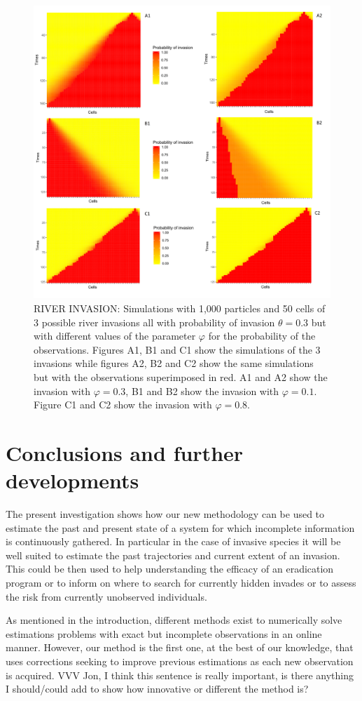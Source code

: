 \begin{figure}
    \includegraphics[width=\textwidth]{river_007.png}
    \caption{RIVER INVASION: Simulations with 1,000 particles and 50 cells of 3 possible river invasions all with probability of invasion $\theta = 0.3$ but with different values of the parameter $\varphi$ for the probability of the observations. Figures A1, B1 and C1 show the simulations of the 3 invasions while figures A2, B2 and C2 show the same simulations but with the observations superimposed in red. A1 and A2 show the invasion with $\varphi = 0.3$, B1 and B2 show the invasion with $\varphi = 0.1$. Figure C1 and C2 show the invasion with $\varphi = 0.8$.}
    \label{fig:2}
\end{figure}

\section{Conclusions and further developments}
\label{sec:9}

{\color{blue} The present investigation shows how our new methodology can be used to estimate the past and present state of a system for which incomplete information is continuously gathered. In particular in the case of invasive species it will be well suited to estimate the past trajectories and current extent of an invasion. This could be then used to help understanding the efficacy of an eradication program or to inform on where to search for currently hidden invades or to assess the risk from currently unobserved individuals.

As mentioned in the introduction, different methods exist to numerically solve estimations problems with exact but incomplete observations in an online manner. However, our method is the first one, at the best of our knowledge, that uses corrections seeking to improve previous estimations as each new observation is acquired. VVV Jon, I think this sentence is really important, is there anything I should/could add to show how innovative or different the method is?}

